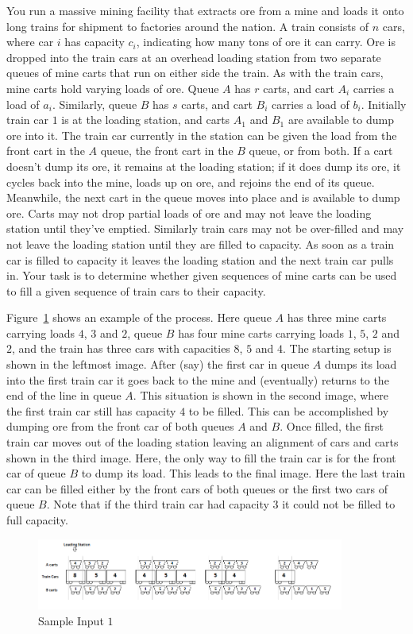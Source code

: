 You run a massive mining facility that extracts ore from a mine and loads it onto long trains for shipment to factories around the nation. A train consists of $n$ cars, where car $i$ has capacity $c_i$, indicating how many tons of ore it can carry. Ore is dropped into the train cars at an overhead loading station from two separate queues of mine carts that run on either side the train. As with the train cars, mine carts hold varying loads of ore. Queue $A$ has $r$ carts, and cart $A_i$ carries a load of $a_i$. Similarly, queue $B$ has $s$ carts, and cart $B_i$ carries a load of $b_i$. Initially train car $1$ is at the loading station, and carts $A_1$ and $B_1$ are available to dump ore into it. The train car currently in the station can be given the load from the front cart in the $A$ queue, the front cart in the $B$ queue, or from both. If a cart doesn't dump its ore, it remains at the loading station; if it does dump its ore, it cycles back into the mine, loads up on ore, and rejoins the end of its queue. Meanwhile, the next cart in the queue moves into place and is available to dump ore.  Carts may not drop partial loads of ore and may not leave the loading station until they've emptied.  Similarly train cars may not be over-filled and may not leave the loading station until they are filled to capacity.  As soon as a train car is filled to capacity it leaves the loading station and the next train car pulls in. Your task is to determine whether given sequences of mine carts can be used to fill a given sequence of train cars to their capacity.

Figure~\ref{fig:ore1} shows an example of the process.  Here queue $A$ has three mine carts carrying loads $4$, $3$ and $2$, queue $B$ has four mine carts carrying loads $1$, $5$, $2$ and $2$, and the train has three cars with capacities $8$, $5$ and $4$.  The starting setup is shown in the leftmost image.  After (say) the first car in queue $A$ dumps its load into the first train car it goes back to the mine and (eventually) returns to the end of the line in queue $A$.  This situation is shown in the second image, where  the first train car still has capacity $4$ to be filled.  This can be accomplished by dumping ore from the front car of both queues $A$ and $B$. Once filled, the first train car moves out of the loading station leaving an alignment of cars and carts shown in the third image.  Here, the only way to fill the train car is for the front car of queue $B$ to dump its load.  This leads to the final image.  Here the last train car can be filled either by the front cars of both queues or the first two cars of queue $B$.  Note that if the third train car had capacity $3$ it could not be filled to full capacity.
\begin{figure}[!h]
\centering
\includegraphics[width=0.9\textwidth]{ore1.png}
\caption{Sample Input $1$}
\label{fig:ore1}
\end{figure}

